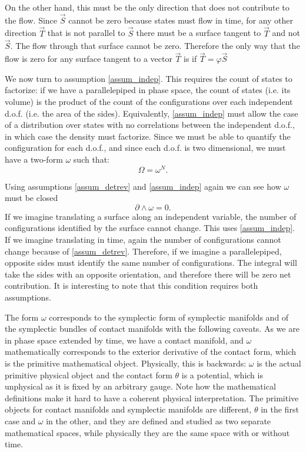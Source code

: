 \documentclass[fleqn,10pt]{wlscirep}
\begin{document}
On the other hand, this must be the only direction that does not contribute to the flow. Since $\vec{S}$ cannot be zero because states must flow in time, for any other direction $\vec{T}$ that is not parallel to $\vec{S}$ there must be a surface tangent to $\vec{T}$ and not $\vec{S}$. The flow through that surface cannot be zero. Therefore the only way that the flow is zero for any surface tangent to a vector $\vec{T}$ is if $\vec{T}= \varphi \vec{S}$

We now turn to assumption \ref{assum_indep}. This requires the count of states to factorize: if we have a parallelepiped in phase space, the count of states (i.e. its volume) is the product of the count of the configurations over each independent d.o.f. (i.e. the area of the sides). Equivalently, \ref{assum_indep} must allow the case of a distribution over states with no correlations between the independent d.o.f., in which case the density must factorize. Since we must be able to quantify the configuration for each d.o.f., and since each d.o.f. is two dimensional, we must have a two-form $\omega$ such that:
\begin{equation}
	\Omega = \omega^N.
\end{equation}

Using assumptions \ref{assum_detrev} and \ref{assum_indep} again we can see how $\omega$ must be closed
\begin{equation}
	\partial \wedge \omega = 0.
\end{equation}
If we imagine translating a surface along an independent variable, the number of configurations identified by the surface cannot change. This uses \ref{assum_indep}. If we imagine translating in time, again the number of configurations cannot change because of \ref{assum_detrev}. Therefore, if we imagine a parallelepiped, opposite sides must identify the same number of configurations. The integral will take the sides with an opposite orientation, and therefore there will be zero net contribution. It is interesting to note that this condition requires both assumptions.

The form $\omega$ corresponds to the symplectic form of symplectic manifolds and of the symplectic bundles of contact manifolds with the following caveats. As we are in phase space extended by time, we have a contact manifold, and $\omega$ mathematically corresponds to the exterior derivative of the contact form, which is the primitive mathematical object. Physically, this is backwards: $\omega$ is the actual primitive physical object and the contact form $\theta$ is a potential, which is unphysical as it is fixed by an arbitrary gauge. Note how the mathematical definitions make it hard to have a coherent physical interpretation. The primitive objects for contact manifolds and symplectic manifolds are different, $\theta$ in the first case and $\omega$ in the other, and they are defined and studied as two separate mathematical spaces, while physically they are the same space with or without time.
\end{document}
